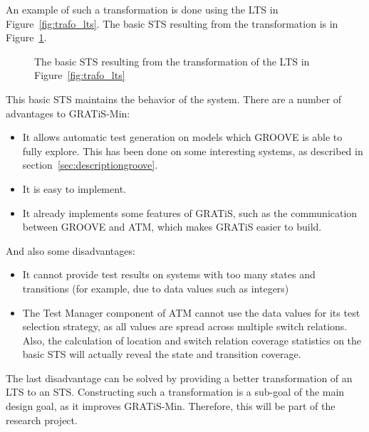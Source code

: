 An example of such a transformation is done using the LTS in Figure~\ref{fig:trafo_lts}. The basic STS resulting from the transformation is in Figure~\ref{fig:trafo_basic_sts}.

\begin{figure}[h]
  \begin{center}
    
  \end{center}
  \caption{The basic STS resulting from the transformation of the LTS in Figure~\ref{fig:trafo_lts}}
  \label{fig:trafo_basic_sts}
\end{figure}

This basic STS maintains the behavior of the system. There are a number of advantages to GRATiS-Min:
\begin{itemize}
  \item It allows automatic test generation on models which GROOVE is able to fully explore. This has been done on some interesting systems, as described in section~\ref{sec:descriptiongroove}.
  \item It is easy to implement.
  \item It already implements some features of GRATiS, such as the communication between GROOVE and ATM, which makes GRATiS easier to build.
\end{itemize}
And also some disadvantages:
\begin{itemize}
  \item It cannot provide test results on systems with too many states and transitions (for example, due to data values such as integers)
  \item The Test Manager component of ATM cannot use the data values for its test selection strategy, as all values are spread across multiple switch relations. Also, the calculation of location and switch relation coverage statistics on the basic STS will actually reveal the state and transition coverage.
\end{itemize}
The last disadvantage can be solved by providing a better transformation of an LTS to an STS. Constructing such a transformation is a sub-goal of the main design goal, as it improves GRATiS-Min. Therefore, this will be part of the research project.

